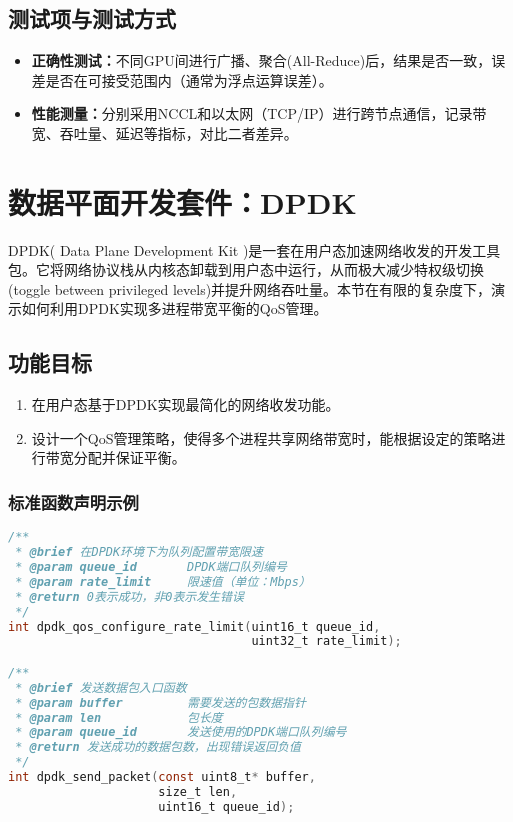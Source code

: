 \subsection{测试项与测试方式}
\begin{itemize}
    \item \textbf{正确性测试：}不同GPU间进行广播、聚合(All-Reduce)后，结果是否一致，误差是否在可接受范围内（通常为浮点运算误差）。
    \item \textbf{性能测量：}分别采用NCCL和以太网（TCP/IP）进行跨节点通信，记录带宽、吞吐量、延迟等指标，对比二者差异。
\end{itemize}

\section{数据平面开发套件：DPDK}
DPDK( Data Plane Development Kit )是一套在用户态加速网络收发的开发工具包。它将网络协议栈从内核态卸载到用户态中运行，从而极大减少特权级切换(toggle between privileged levels)并提升网络吞吐量。本节在有限的复杂度下，演示如何利用DPDK实现多进程带宽平衡的QoS管理。

\subsection{功能目标}
\begin{enumerate}
    \item 在用户态基于DPDK实现最简化的网络收发功能。
    \item 设计一个QoS管理策略，使得多个进程共享网络带宽时，能根据设定的策略进行带宽分配并保证平衡。
\end{enumerate}

\subsubsection{标准函数声明示例}
\begin{lstlisting}[language=C, caption={示例：DPDK QoS管理接口}]
/**
 * @brief 在DPDK环境下为队列配置带宽限速
 * @param queue_id       DPDK端口队列编号
 * @param rate_limit     限速值（单位：Mbps）
 * @return 0表示成功，非0表示发生错误
 */
int dpdk_qos_configure_rate_limit(uint16_t queue_id, 
                                  uint32_t rate_limit);

/**
 * @brief 发送数据包入口函数
 * @param buffer         需要发送的包数据指针
 * @param len            包长度
 * @param queue_id       发送使用的DPDK端口队列编号
 * @return 发送成功的数据包数，出现错误返回负值
 */
int dpdk_send_packet(const uint8_t* buffer, 
                     size_t len, 
                     uint16_t queue_id);
\end{lstlisting}

